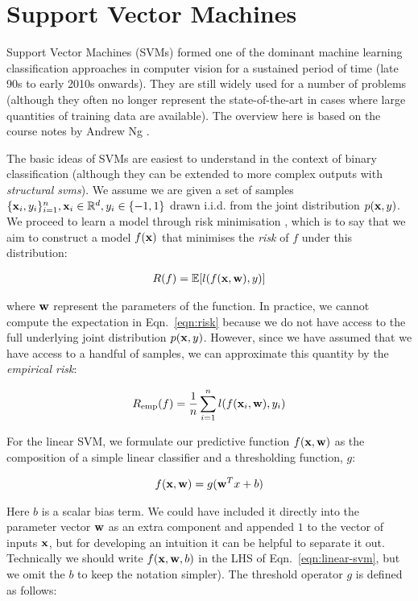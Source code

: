 \chapter{Support Vector Machines} \label{sec:svms}

Support Vector Machines (SVMs) formed one of the dominant machine learning classification approaches in computer vision for a sustained period of time (late 90s to early 2010s onwards).  They are still widely used for a number of problems (although they often no longer represent the state-of-the-art in cases where large quantities of training data are available).  The overview here is based on the course notes by Andrew Ng \cite{svmsNg}.

The basic ideas of SVMs are easiest to understand in the context of binary classification (although they can be extended to more complex outputs with \textit{structural svms}).   We assume we are given a set of samples $\{\mathbf{x}_i, y_i\}_{i=1}^n, \mathbf{x}_i \in \mathbb{R}^d, y_i \in \{-1, 1\}$ drawn i.i.d. from the joint distribution $p(\mathbf{x},y)$.  We proceed to learn a model through risk minimisation \cite{vapnik1992principles}, which is to say that we aim to construct a model $f(\mathbf{x})$ that minimises the \textit{risk} of $f$ under this distribution:

\begin{align}
R(f) = \mathbb{E}[l(f(\mathbf{x}, \mathbf{w}), y)] \label{eqn:risk}
\end{align}

where $\mathbf{w}$ represent the parameters of the function. In practice, we cannot compute the expectation in Eqn.~\ref{eqn:risk} because we do not have access to the full underlying joint distribution $p(\mathbf{x}, y)$.  However, since we have assumed that we have access to a handful of samples, we can approximate this quantity by the \textit{empirical risk}:

\begin{align}
R_{\text{emp}}(f) = \frac{1}{n}\sum_{i=1}^n l(f(\mathbf{x}_i, \mathbf{w}), y_i) \label{eqn:empirical-risk}
\end{align}

For the linear SVM, we formulate our predictive function $f(\mathbf{x}, \mathbf{w})$ as the composition of a simple linear classifier and a thresholding function, $g$:

\begin{align}
f(\mathbf{x}, \mathbf{w}) = g(\mathbf{w}^Tx + b) \label{eqn:linear-svm}
\end{align}

Here $b$ is a scalar bias term.  We could have included it directly into the parameter vector $\mathbf{w}$ as an extra component and appended $1$ to the vector of inputs $\mathbf{x}$, but for developing an intuition it can be helpful to separate it out.  Technically we should write $f(\mathbf{x}, \mathbf{w}, b)$ in the LHS of Eqn.~\ref{eqn:linear-svm}, but we omit the $b$ to keep the notation simpler). The threshold operator $g$ is defined as follows:


